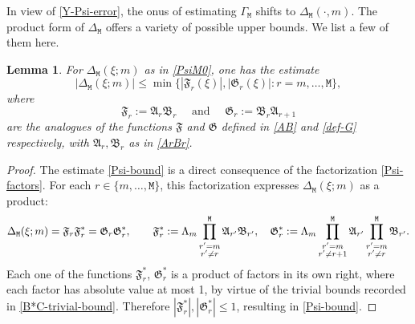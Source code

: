 \documentclass[12pt, twoside]{article}
\newtheorem{lemma}[theorem]{Lemma}
\theoremstyle{definition}
\numberwithin{equation}{section}
\begin{document}
\noindent In view of \eqref{Y-Psi-error},  the onus of estimating $\Gamma_{\mathtt M}$ shifts to $\Delta_{\mathtt M}(\cdot, m)$. The product form of $\Delta_{\mathtt M}$ offers a variety of possible upper bounds. We list a few of them here.  
\begin{lemma} \label{Psi-bound-lemma} 
For $\Delta_{\mathtt M}(\xi; m)$ as in \eqref{PsiM0}, one has the estimate 
\begin{equation}  \label{Psi-bound}
|\Delta_{\mathtt M}(\xi; m)| \leq \min \bigl\{|\mathfrak F_r(\xi)|, |\mathfrak G_r(\xi)| : r = m, \ldots, \mathtt M \bigr\}, 
\end{equation} 
where 
\begin{equation} 
\mathfrak F_r := \mathfrak A_r \mathfrak B_r \quad \text{ and } \quad \mathfrak G_r := \mathfrak B_r \mathfrak A_{r+1}
\end{equation} are the analogues of the functions $\mathfrak F$ and $\mathfrak G$ defined in \eqref{AB} and \eqref{def-G} respectively, with $\mathfrak A_r, \mathfrak B_r$ as in \eqref{ArBr}. 
\end{lemma} 
\begin{proof} 
The estimate \eqref{Psi-bound} is a direct consequence of the factorization \eqref{Psi-factors}. For each $r \in \{m, \ldots, \mathtt M\}$, this factorization expresses $\Delta_{\mathtt M}(\xi; m)$ as a product: 
\[ \Delta_{\mathtt M}(\xi; m) = \mathfrak F_r \mathfrak F^{\ast}_r = \mathfrak G_r \mathfrak G_r^{\ast}, \qquad \mathfrak F^{\ast}_r := \Lambda_m \prod_{\begin{subarray}{c}r' = m \\ r' \ne r \end{subarray}}^{\mathtt M} \mathfrak A_{r'} \mathfrak B_{r'}, \quad \mathfrak G^{\ast}_r := \Lambda_m \prod_{\begin{subarray}{c}r' = m \\ r' \ne r+1 \end{subarray}}^{\mathtt M} \mathfrak A_{r'} \prod_{\begin{subarray}{c}r' = m \\ r' \ne r\end{subarray}}^{\mathtt M}\mathfrak B_{r'}. \] 
Each one of the functions $\mathfrak F_r^{\ast}$, $\mathfrak G_r^{\ast}$ is a product of factors in its own right, 
where each factor has absolute value at most 1, by virtue of the trivial bounds recorded in \eqref{B*C-trivial-bound}. Therefore $|\mathfrak F^{\ast}_r|, |\mathfrak G^{\ast}_r| \leq 1$, resulting in \eqref{Psi-bound}.   
\end{proof} 
\end{document}

